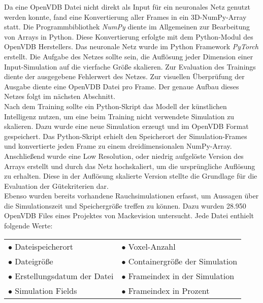 Da eine OpenVDB Datei nicht direkt als Input für ein neuronales Netz genutzt werden konnte, fand eine Konvertierung aller Frames in ein 3D-NumPy-Array statt. Die Programmbibliothek \textit{NumPy} \parencite[]{harris2020array} diente im Allgemeinen zur Bearbeitung von Arrays in Python. Diese Konvertierung erfolgte mit dem Python-Modul des OpenVDB Herstellers. Das neuronale Netz wurde im Python Framework \textit{PyTorch} \parencite[]{torch} erstellt. Die Aufgabe des Netzes sollte sein, die Auflösung jeder Dimension einer Input-Simulation auf die vierfache Größe skalieren. Zur Evaluation des Trainings diente der ausgegebene Fehlerwert des Netzes. Zur visuellen Überprüfung der Ausgabe diente eine OpenVDB Datei pro Frame. Der genaue Aufbau dieses Netzes folgt im nächsten Abschnitt. \\

Nach dem Training sollte ein Python-Skript das Modell der künstlichen Intelligenz nutzen, um eine beim Training nicht verwendete Simulation zu skalieren. Dazu wurde eine neue Simulation erzeugt und im OpenVDB Format gespeichert. Das Python-Skript erhielt den Speicherort der Simulation-Frames und konvertierte jeden Frame zu einem dreidimensionalen NumPy-Array. Anschließend wurde eine Low Resolution, oder niedrig aufgelöste Version des Arrays erstellt und durch das Netz hochskaliert, um die ursprüngliche Auflösung zu erhalten. Diese in der Auflösung skalierte Version stellte die Grundlage für die Evaluation der Gütekriterien dar. \\

Ebenso wurden bereits vorhandene Rauchsimulationen erfasst, um Aussagen über die Simulationszeit und Speichergröße treffen zu können. Dazu wurden 28.950 OpenVDB Files eines Projektes von Mackevision untersucht. Jede Datei enthielt folgende Werte: 

\begin{center}
\begin{tabular}{ l l }

$\bullet$ Dateispeicherort & $\bullet$ Voxel-Anzahl \\
$\bullet$ Dateigröße & $\bullet$ Containergröße der Simulation \\
$\bullet$ Erstellungsdatum der Datei & $\bullet$ Frameindex in der Simulation \\
$\bullet$ Simulation Fields & $\bullet$ Frameindex in Prozent \\

\end{tabular}
\end{center}


